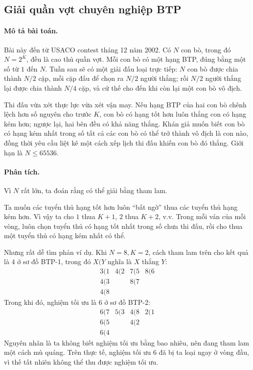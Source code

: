 \documentclass[11pt]{article}
\begin{document}
\subsection{Giải quần vợt chuyên nghiệp BTP}

\paragraph{Mô tả bài toán.}
Bài này đến từ USACO contest tháng 12 năm 2002. Có $N$ con bò, trong đó
$N=2^K$, đều là cao thủ quần vợt. Mỗi con bò có một hạng BTP, đúng bằng một
số từ $1$ đến $N$. Tuần sau sẽ có một giải đấu loại trực tiếp: $N$ con bò được
chia thành $N/2$ cặp, mỗi cặp đấu để chọn ra $N/2$ người thắng; rồi $N/2$
người thắng lại được chia thành $N/4$ cặp, và cứ thế cho đến khi còn lại một
con bò vô địch.

Thi đấu vừa xét thực lực vừa xét vận may. Nếu hạng BTP của hai con bò chênh
lệch hơn số nguyên cho trước $K$, con bò có hạng tốt hơn luôn thắng con có
hạng kém hơn; ngược lại, hai bên đều có khả năng thắng. Khán giả muốn biết
con bò có hạng kém nhất trong số tất cả các con bò có thể trở thành vô địch
là con nào, đồng thời yêu cầu liệt kê một cách xếp lịch thi đấu khiến con bò
đó thắng. Giới hạn là $N\le 65536$.

\paragraph{Phân tích.}
Vì $N$ rất lớn, ta đoán rằng có thể giải bằng tham lam.

Ta muốn các tuyển thủ hạng tốt hơn luôn ``bất ngờ'' thua các tuyển thủ hạng
kém hơn. Vì vậy ta cho $1$ thua $K+1$, $2$ thua $K+2$, v.v. Trong mỗi ván của
mỗi vòng, luôn chọn tuyển thủ có hạng tốt nhất trong số chưa thi đấu, rồi cho
thua một tuyển thủ có hạng kém nhất có thể.

Nhưng rất dễ tìm phản ví dụ. Khi $N=8, K=2$, cách tham lam trên cho kết quả
là $4$ ở sơ đồ BTP-1, trong đó $X(Y$ nghĩa là $X$ thắng $Y$:
\[
\begin{array}{cccc}
3(1 & 4(2 & 7(5 & 8(6\\
4(3 &     & 8(7\\
4(8
\end{array}
\]
Trong khi đó, nghiệm tối ưu là $6$ ở sơ đồ BTP-2:
\[
\begin{array}{cccc}
6(7 & 5(3 & 4(8 & 2(1\\
6(5 &     & 4(2\\
6(4
\end{array}
\]
Nguyên nhân là ta không biết nghiệm tối ưu bằng bao nhiêu, nên đang tham lam
một cách mù quáng. Trên thực tế, nghiệm tối ưu $6$ đã bị ta loại ngay ở vòng
đầu, vì thế tất nhiên không thể thu được nghiệm tối ưu.
\end{document}
